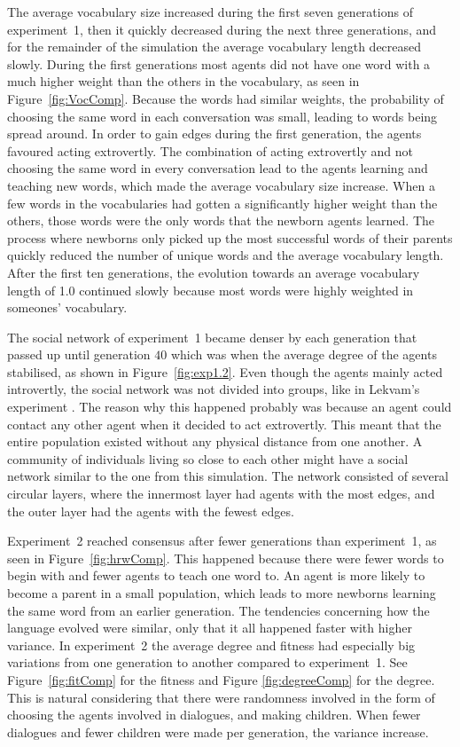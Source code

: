 The average vocabulary size increased during the first seven generations of experiment~1, then it quickly decreased during the next three generations, and for the remainder of the simulation the average vocabulary length decreased slowly. During the first generations most agents did not have one word with a much higher weight than the others in the vocabulary, as seen in Figure~\ref{fig:VocComp}. Because the words had similar weights, the probability of choosing the same word in each conversation was small, leading to words being spread around. In order to gain edges during the first generation, the agents favoured acting extrovertly. The combination of acting extrovertly and not choosing the same word in every conversation lead to the agents learning and teaching new words, which made the average vocabulary size increase. When a few words in the vocabularies had gotten a significantly higher weight than the others, those words were the only words that the newborn agents learned. The process where newborns only picked up the most successful words of their parents quickly reduced the number of unique words and the average vocabulary length. After the first ten generations, the evolution towards an average vocabulary length of 1.0 continued slowly because most words were highly weighted in someones' vocabulary.
 
The social network of experiment~1 became denser by each generation that passed up until generation $40$ which was when the average degree of the agents stabilised, as shown in Figure~\ref{fig:exp1.2}. Even though the agents mainly acted introvertly, the social network was not divided into groups, like in Lekvam’s experiment \citep[Section 5.1]{lekvam2014co}. The reason why this happened probably was because an agent could contact any other agent when it decided to act extrovertly. This meant that the entire population existed without any physical distance from one another. A community of individuals living so close to each other might have a social network similar to the one from this simulation. The network consisted of several circular layers, where the innermost layer had agents with the most edges, and the outer layer had the agents with the fewest edges.

Experiment~2 reached consensus after fewer generations than experiment~1, as seen in Figure~\ref{fig:hrwComp}. This happened because there were fewer words to begin with and fewer agents to teach one word to. An agent is more likely to become a parent in a small population, which leads to more newborns learning the same word from an earlier generation. The tendencies concerning how the language evolved were similar, only that it all happened faster with higher variance. In experiment~2 the average degree and fitness had especially big variations from one generation to another compared to experiment~1. See Figure~\ref{fig:fitComp} for the fitness and Figure \ref{fig:degreeComp} for the degree. This is natural considering that there were randomness involved in the form of choosing the agents involved in dialogues, and making children. When fewer dialogues and fewer children were made per generation, the variance increase.

